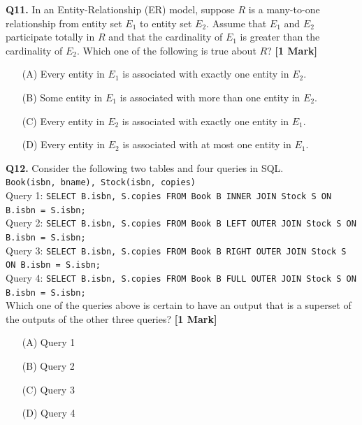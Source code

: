 \documentclass[11pt]{article}
\newcommand{\questiona}[2]{
    \noindent\textbf{Q#2.} #1 \hfill \textbf{[1 Mark]}
}
\begin{document}
\questiona{In an Entity-Relationship (ER) model, suppose \( R \) is a many-to-one relationship from entity set \( E_1 \) to entity set \( E_2 \). Assume that \( E_1 \) and \( E_2 \) participate totally in \( R \) and that the cardinality of \( E_1 \) is greater than the cardinality of \( E_2 \). Which one of the following is true about \( R \)?}{11}
\begin{enumerate}
    \item[(A)] Every entity in \( E_1 \) is associated with exactly one entity in \( E_2 \).
    \item[(B)] Some entity in \( E_1 \) is associated with more than one entity in \( E_2 \).
    \item[(C)] Every entity in \( E_2 \) is associated with exactly one entity in \( E_1 \).
    \item[(D)] Every entity in \( E_2 \) is associated with at most one entity in \( E_1 \).
\end{enumerate}
\vspace{0.5cm}

\questiona{Consider the following two tables and four queries in SQL.\\
\texttt{Book(isbn, bname), Stock(isbn, copies)}\\
Query 1: \texttt{SELECT B.isbn, S.copies FROM Book B INNER JOIN Stock S ON B.isbn = S.isbn;}\\
Query 2: \texttt{SELECT B.isbn, S.copies FROM Book B LEFT OUTER JOIN Stock S ON B.isbn = S.isbn;}\\
Query 3: \texttt{SELECT B.isbn, S.copies FROM Book B RIGHT OUTER JOIN Stock S ON B.isbn = S.isbn;}\\
Query 4: \texttt{SELECT B.isbn, S.copies FROM Book B FULL OUTER JOIN Stock S ON B.isbn = S.isbn;}\\
Which one of the queries above is certain to have an output that is a superset of the outputs of the other three queries?}{12}
\begin{enumerate}
    \item[(A)] Query 1
    \item[(B)] Query 2
    \item[(C)] Query 3
    \item[(D)] Query 4
\end{enumerate}
\vspace{0.5cm}
\end{document}
